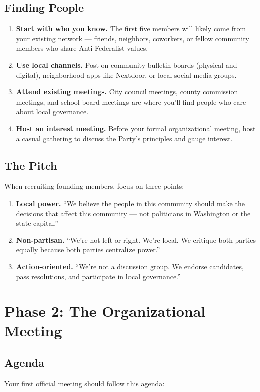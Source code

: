 \documentclass[11pt, letterpaper]{article}
\begin{document}
\subsection{Finding People}
\begin{enumerate}
  \item \textbf{Start with who you know.} The first five members will likely come from your existing network --- friends, neighbors, coworkers, or fellow community members who share Anti-Federalist values.
  \item \textbf{Use local channels.} Post on community bulletin boards (physical and digital), neighborhood apps like Nextdoor, or local social media groups.
  \item \textbf{Attend existing meetings.} City council meetings, county commission meetings, and school board meetings are where you'll find people who care about local governance.
  \item \textbf{Host an interest meeting.} Before your formal organizational meeting, host a casual gathering to discuss the Party's principles and gauge interest.
\end{enumerate}

\subsection{The Pitch}
When recruiting founding members, focus on three points:
\begin{enumerate}
  \item \textbf{Local power.} ``We believe the people in this community should make the decisions that affect this community --- not politicians in Washington or the state capital.''
  \item \textbf{Non-partisan.} ``We're not left or right. We're local. We critique both parties equally because both parties centralize power.''
  \item \textbf{Action-oriented.} ``We're not a discussion group. We endorse candidates, pass resolutions, and participate in local governance.''
\end{enumerate}


\section{Phase 2: The Organizational Meeting}

\subsection{Agenda}
Your first official meeting should follow this agenda:
\end{document}
